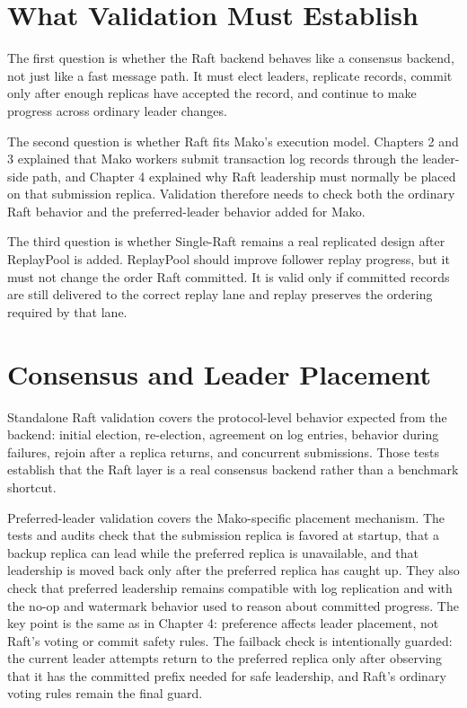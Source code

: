 \section{What Validation Must Establish}

The first question is whether the Raft backend behaves like a consensus backend,
not just like a fast message path. It must elect leaders, replicate records,
commit only after enough replicas have accepted the record, and continue to make
progress across ordinary leader changes.

The second question is whether Raft fits Mako's execution model. Chapters 2 and
3 explained that Mako workers submit transaction log records through the
leader-side path, and Chapter 4 explained why Raft leadership must normally be
placed on that submission replica. Validation therefore needs to check both the
ordinary Raft behavior and the preferred-leader behavior added for Mako.

The third question is whether Single-Raft remains a real replicated design after
ReplayPool is added. ReplayPool should improve follower replay progress, but it
must not change the order Raft committed. It is valid only if committed records
are still delivered to the correct replay lane and replay preserves the ordering
required by that lane.

\section{Consensus and Leader Placement}

Standalone Raft validation covers the protocol-level behavior expected from the
backend: initial election, re-election, agreement on log entries, behavior
during failures, rejoin after a replica returns, and concurrent submissions.
Those tests establish that the Raft layer is a real consensus backend rather
than a benchmark shortcut.

Preferred-leader validation covers the Mako-specific placement mechanism. The
tests and audits check that the submission replica is favored at startup, that a
backup replica can lead while the preferred replica is unavailable, and that
leadership is moved back only after the preferred replica has caught up. They
also check that preferred leadership remains compatible with log replication and
with the no-op and watermark behavior used to reason about committed progress.
The key point is the same as in Chapter 4: preference affects leader placement,
not Raft's voting or commit safety rules. The failback check is intentionally
guarded: the current leader attempts return to the preferred replica only after
observing that it has the committed prefix needed for safe leadership, and
Raft's ordinary voting rules remain the final guard.

